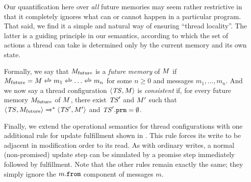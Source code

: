 
\figupdates

Our quantification here over \emph{all} future memories may seem
rather restrictive in that it completely ignores what can or cannot
happen in a particular program.  That said, we find it a simple and
natural way of ensuring ``thread locality''.  The latter is a guiding
principle in our semantics, according to which the set of actions a
thread can take is determined only by the current memory and its own
state.

Formally, we say that ${M}_{\text{future}}$ is a \emph{future memory} of $M$ if
${\omem = \mem \insertadd m_1 \insertadd \ldots \insertadd m_n}$
for some $n\geq 0$ and messages $m_1,\ldots,m_n$. And
we now say a thread configuration ${\langle{\mathit{TS},M}\rangle}$ is
\emph{consistent} if, for every future memory ${M}_{\text{future}}$ of $M$, there
exist $\mathit{TS}'$ and $M'$ such that ${\langle{\mathit{TS},{M}_{\text{future}}}\rangle} \xrightarrow{}^* {\langle{\mathit{TS}',M'}\rangle}$
and $\mathit{TS}'.\texttt{prm} = \emptyset$.

Finally, we extend the operational semantics for thread configurations
with one additional rule for update fulfillment shown in
.  This rule forces its write to be adjacent in
modification order to its read.  As with ordinary writes, a normal
(non-promised) update step can be simulated by a promise step
immediately followed by fulfillment.  Note that the other rules remain
exactly the same; they simply ignore the $m.{\texttt{from}}$ component of
messages $m$.




